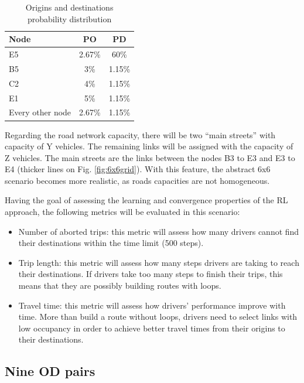 \documentclass{RITA}
\begin{document}
{%
\begin{table}[ht]
\begin{center}
\begin{tabular}{|l|c|c|} \hline
Node & PO & PD \\ \hline
E5 & 2.67\% & 60\% \\ \hline
B5 & 3\% & 1.15\% \\ \hline
C2 & 4\% & 1.15\% \\ \hline
E1 & 5\% & 1.15\% \\ \hline
Every other node & 2.67\% & 1.15\% \\ \hline
\end{tabular}
\caption{Origins and destinations probability distribution}\label{tab:odprob}
\end{center}
\end{table}
}%
Regarding the road network capacity, there will be two ``main streets'' with capacity of Y vehicles. The remaining links will be assigned with the capacity of Z vehicles. The main streets are the links between the nodes B3 to E3 and E3 to E4 (thicker lines on Fig. \ref{fig:6x6grid}). With this feature, the abstract 6x6 scenario becomes more realistic, as roads capacities are not homogeneous.

Having the goal of assessing the learning and convergence properties of the RL approach, the following metrics will be evaluated in this scenario:

\begin{itemize}
  \item Number of aborted trips: this metric will assess how many drivers cannot find their destinations within the time limit (500 steps).
  \item Trip length: this metric will assess how many steps drivers are taking to reach their destinations. If drivers take too many steps to finish their trips, this means that they are possibly building routes with loops.
 \item Travel time: this metric will assess how drivers' performance improve with time. More than build a route without loops, drivers need to select links with low occupancy in order to achieve better travel times from their origins to their destinations.
\end{itemize}

\subsection{Nine OD pairs}
\end{document}
